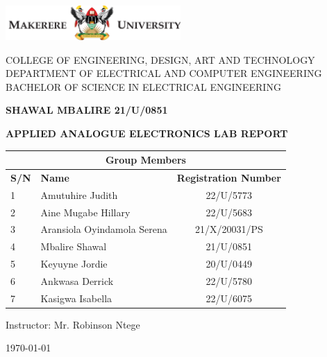 \documentclass[12pt,a4paper]{article}
\begin{document}
\begin{titlepage}
    \begin{center}
        \includegraphics[width=0.5\textwidth]{mak_logo.png} %
        \vfill
        
        \large COLLEGE OF ENGINEERING, DESIGN, ART AND TECHNOLOGY\\
        \vspace{10pt}
        DEPARTMENT OF ELECTRICAL AND COMPUTER ENGINEERING\\
        \vspace{20pt}
        BACHELOR OF SCIENCE IN ELECTRICAL ENGINEERING\\
        \vspace{20pt}
        
        \textbf{SHAWAL MBALIRE 21/U/0851}\\
        \vspace{20pt}
        
        \textbf{\Large APPLIED ANALOGUE ELECTRONICS LAB REPORT}\\
        \vfill
        
        \begin{table}[H]
        \centering
        \begin{tabular}{|llc|}
            \hline
            \multicolumn{3}{|c|}{\textbf{Group Members}} \\ \hline
            \textbf{S/N} & \textbf{Name} & \textbf{Registration Number} \\ \hline
            1 & Amutuhire Judith & 22/U/5773 \\ \hline
            2 & Aine Mugabe Hillary & 22/U/5683 \\ \hline
            3 & Aransiola Oyindamola Serena & 21/X/20031/PS \\ \hline
            4 & Mbalire Shawal & 21/U/0851 \\ \hline
            5 & Keyuyne Jordie & 20/U/0449 \\ \hline
            6 & Ankwasa Derrick & 22/U/5780 \\ \hline
            7 & Kasigwa Isabella & 22/U/6075 \\ \hline
        \end{tabular}
        \end{table}
        
        \vfill

        Instructor: Mr. Robinson Ntege\\
        \vspace{30pt}
        
        \normalsize \today
    \end{center}
\end{titlepage}
\end{document}
